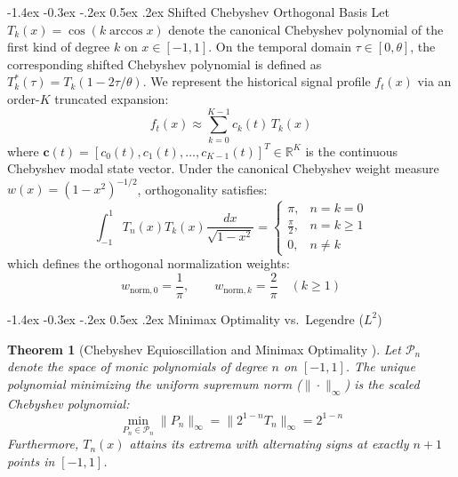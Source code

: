 \documentclass[10pt,twocolumn,a4paper]{article}
\makeatletter
\renewcommand\subsection{\@startsection{subsection}{2}{\z@}%
  {-1.4ex \@plus -0.3ex \@minus -.2ex}%
  {0.5ex \@plus .2ex}%
  {\normalfont\normalsize\bfseries}}
\theoremstyle{plain}
\newtheorem{theorem}{Theorem}
\theoremstyle{definition}
\makeatother
\begin{document}
\subsection{Shifted Chebyshev Orthogonal Basis}
Let $T_k(x) = \cos(k \arccos x)$ denote the canonical Chebyshev polynomial of the first kind of degree $k$ on $x \in [-1, 1]$. On the temporal domain $\tau \in [0, \theta]$, the corresponding shifted Chebyshev polynomial is defined as $T_k^*(\tau) = T_k(1 - 2\tau/\theta)$. We represent the historical signal profile $f_t(x)$ via an order-$K$ truncated expansion:
\begin{equation}
f_t(x) \approx \sum_{k=0}^{K-1} c_k(t) \, T_k(x)
\label{eq:cheb_expansion}
\end{equation}
where $\mathbf{c}(t) = [c_0(t), c_1(t), \dots, c_{K-1}(t)]^T \in \mathbb{R}^K$ is the continuous Chebyshev modal state vector. Under the canonical Chebyshev weight measure $w(x) = (1 - x^2)^{-1/2}$, orthogonality satisfies:
\begin{equation}
\int_{-1}^1 T_n(x) T_k(x) \frac{dx}{\sqrt{1 - x^2}} = \begin{cases}
\pi, & n = k = 0 \\
\frac{\pi}{2}, & n = k \ge 1 \\
0, & n \ne k
\end{cases}
\label{eq:cheb_ortho}
\end{equation}
which defines the orthogonal normalization weights:
\begin{equation}
w_{\mathrm{norm}, 0} = \frac{1}{\pi}, \qquad w_{\mathrm{norm}, k} = \frac{2}{\pi} \quad (k \ge 1)
\label{eq:norm_weights}
\end{equation}

\subsection{Minimax Optimality vs.\ Legendre ($L^2$)}

\begin{theorem}[Chebyshev Equioscillation and Minimax Optimality \cite{trefethen2019approximation}]
Let $\mathcal{P}_n$ denote the space of monic polynomials of degree $n$ on $[-1, 1]$. The unique polynomial minimizing the uniform supremum norm ($\|\cdot\|_\infty$) is the scaled Chebyshev polynomial:
\begin{equation}
\min_{P_n \in \mathcal{P}_n} \|P_n\|_\infty = \|2^{1-n} T_n\|_\infty = 2^{1-n}
\end{equation}
Furthermore, $T_n(x)$ attains its extrema with alternating signs at exactly $n+1$ points in $[-1, 1]$.
\end{theorem}
\end{document}
